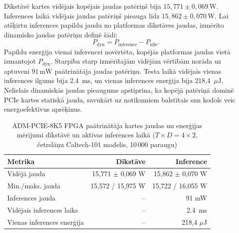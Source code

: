 Dīkstāvē kartes vidējais kopējais jaudas patēriņš bija $15{,}771 \pm 0{,}069\,\text{W}$. Inferences laikā vidējais jaudas patēriņš pieauga līdz $15{,}862 \pm 0{,}070\,\text{W}$. Lai atšķirtu inferences papildu jaudu no platformas dīkstāves jaudas, izmērīto dinamisko jaudas patēriņu definē šādi:
\begin{equation}
    P_{\mathrm{dyn}} =
    P_{\mathrm{inference}} - P_{\mathrm{idle}}.
\end{equation}
Papildu enerģija vienai inferencei novērtēta, kopējās platformas jaudas vietā izmantojot \(P_{\mathrm{dyn}}\). Starpība starp izmērītajām vidējām vērtībām norāda uz aptuveni $91\,\text{mW}$ paātrinātāja jaudas patēriņu. Testa laikā vidējais vienas inferences ilgums bija \qty{2.4}{\milli\second}, un vienas inferences enerģija bija 218,4~$\mu$J. Nelielais dinamiskās jaudas pieaugums apstiprina, ka kopējā patēriņā dominē PCIe kartes statiskā jauda, savukārt uz notikumiem balstītais \Gls{snn} kodols veic energoefektīvus aprēķinus.

\begin{table}[htbp]
\centering
\caption{ADM-PCIE-8K5 FPGA paātrinātāja kartes jaudas un enerģijas mērījumi dīkstāvē un aktīvas inferences laikā ($T\times D = 4\times 2$, četrslāņu Caltech-101 modelis, 10\,000 paraugu)}
\label{tab:measured_power_stats}
\begin{tabular}{l r r}
\toprule
\textbf{Metrika} & \textbf{Dīkstāve} & \textbf{Inference} \\
\midrule
Vidējā jauda & 15{,}771 $\pm$ 0{,}069 W & 15{,}862 $\pm$ 0{,}070 W \\
Min./maks. jauda & 15{,}572 / 15{,}975 W & 15{,}722 / 16{,}055 W \\
Inferences jauda & -- & 91 mW \\
Vidējais inferences laiks & -- & \qty{2.4}{\milli\second} \\
Vienas inferences enerģija & -- &  218{,}4 $\mu$J \\
\bottomrule
\end{tabular}
\end{table}


